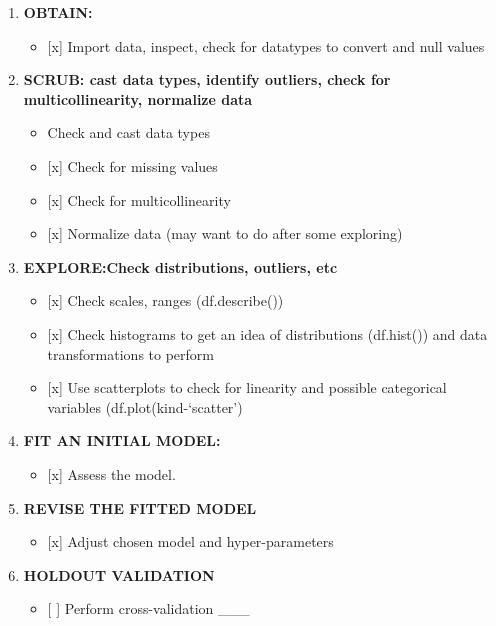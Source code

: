 \documentclass[11pt]{article}
\providecommand{\tightlist}{%
      \setlength{\itemsep}{0pt}\setlength{\parskip}{0pt}}
\begin{document}
    \begin{enumerate}
\def\labelenumi{\arabic{enumi}.}
\tightlist
\item
  \textbf{OBTAIN:}

  \begin{itemize}
  \tightlist
  \item
    {[}x{]} Import data, inspect, check for datatypes to convert and
    null values 
  \end{itemize}
\item
  \textbf{SCRUB: cast data types, identify outliers, check for
  multicollinearity, normalize data}

  \begin{itemize}
  \tightlist
  \item
    Check and cast data types
  \item
    {[}x{]} Check for missing values
  \item
    {[}x{]} Check for multicollinearity
  \item
    {[}x{]} Normalize data (may want to do after some exploring)\\
  \end{itemize}
\item
  \textbf{EXPLORE:Check distributions, outliers, etc}

  \begin{itemize}
  \tightlist
  \item
    {[}x{]} Check scales, ranges (df.describe())
  \item
    {[}x{]} Check histograms to get an idea of distributions (df.hist())
    and data transformations to perform
  \item
    {[}x{]} Use scatterplots to check for linearity and possible
    categorical variables (df.plot(kind-`scatter') 
  \end{itemize}
\item
  \textbf{FIT AN INITIAL MODEL:}

  \begin{itemize}
  \tightlist
  \item
    {[}x{]} Assess the model. 
  \end{itemize}
\item
  \textbf{REVISE THE FITTED MODEL}

  \begin{itemize}
  \tightlist
  \item
    {[}x{]} Adjust chosen model and hyper-parameters 
  \end{itemize}
\item
  \textbf{HOLDOUT VALIDATION}

  \begin{itemize}
  \tightlist
  \item
    {[} {]} Perform cross-validation \_\_\_
  \end{itemize}
\end{enumerate}
\end{document}

